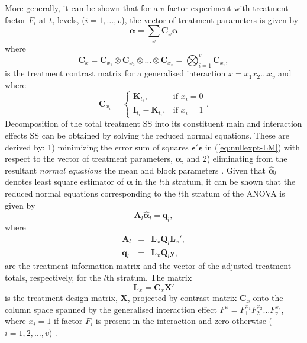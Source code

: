 \documentclass[article]{jss}
\newcommand{\I}{\mathbf{I}}
\newcommand{\K}{\mathbf{K}}
\newcommand{\X}{\mathbf{X}}
\newcommand{\Q}{\mathbf{Q}}
\newcommand{\A}{\mathbf{A}}
\newcommand{\C}{\mathbf{C}}
\newcommand{\mL}{\mathbf{L}}
\begin{document}
More generally, it can be shown that for a $v$-factor experiment with treatment factor $F_i$ at $t_i$ levels, ($i = 1, \dots, v$), the vector of treatment parameters is given by 
\begin{equation}
\bm{\alpha} = \sum_x{\C_x\bm{\alpha}}
\end{equation}
where 
\[
\C_x =  \C_{x_1} \otimes  \C_{x_2} \otimes \dots \otimes  \C_{x_{v}} = \bigotimes^{v} _{i = 1} \C_{x_i},
\]
is the treatment contrast matrix for a generalised interaction $x = x_1 x_2 \dots x_{v}$ and where   
\begin{equation}
\label{eq:contrMat}
 \C_{x_i} =  
   \begin{cases}
       \K_{t_i}, & \mbox{if } x_i = 0 \\
       \I_{t_i} - \K_{t_i}, & \mbox{if } x_i = 1
    \end{cases}.
\end{equation}
Decomposition of the total treatment SS into its constituent main and interaction effects SS can be obtained by solving the reduced normal equations. These are derived by: 1) minimizing the error sum of squares $\bm{\epsilon}'\bm{\epsilon}$ in (\ref{eq:nullexpt-LM}) with respect to the vector of treatment parameters, $\bm{\alpha}$, and 2) eliminating from the resultant \emph{normal equations} the mean and block parameters \citep{John1987}. Given that $\hat{\bm{\alpha}}_l$ denotes least square estimator of $\bm{\alpha}$ in the $l$th stratum, it can be shown that the reduced normal equations corresponding to the $l$th stratum of the ANOVA is given by
\begin{equation}\label{eq:reduceNorml}
\A_l\hat{\bm{\alpha}}_l = \bm{q}_l,
\end{equation}
where
\begin{eqnarray}
\label{eq:infomat-stratuml} \A_l &=& \mL_{x} \Q_l \mL_{x}',\\
\label{eq:adjtrttotals-stratuml} \bm{q}_l &=& \mL_{x} \Q_l\bm{y},
\end{eqnarray}  
are the treatment information matrix and the vector of the adjusted treatment totals, respectively, for the $l$th stratum. The matrix 
\[
\mL_{x} = \C_x \X'
\]
is the treatment design matrix, $\X$, projected by contrast matrix $\C_{x}$ onto the column space spanned by the generalised interaction effect $F^{x}=  F^{x_1}_1 F^{x_2}_2 \dots F^{x_v}_v$, where $x_i=1$ if factor $F_i$ is present in the interaction and zero otherwise ($i=1,2,\ldots,v$) \citep{John1987}.
\end{document}
